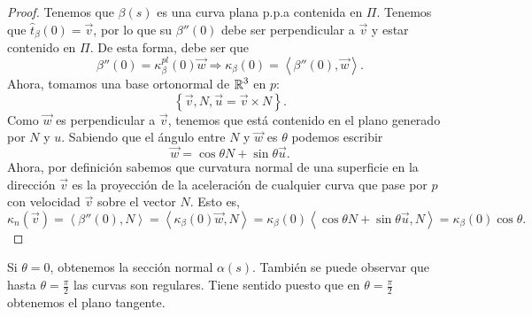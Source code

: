 \begin{proof}
Tenemos que $\displaystyle \beta\left(s\right) $ es una curva plana p.p.a contenida en $\displaystyle \Pi $. Tenemos que $\displaystyle \hat{t}_{\beta }\left(0\right)=\vec{v} $, por lo que su $\displaystyle \beta''\left(0\right) $ debe ser perpendicular a $\displaystyle \vec{v} $ y estar contenido en $\displaystyle \Pi $. De esta forma, debe ser que 
\[\beta''\left(0\right)=\kappa_{\beta }^{pl}\left(0\right)\vec{w} \Rightarrow \kappa_{\beta }\left(0\right)=\left\langle \beta''\left(0\right), \vec{w} \right\rangle  .\]
Ahora, tomamos una base ortonormal de $\displaystyle \mathbb{R}^{3} $ en $\displaystyle p $:
\[ \left\{ \vec{v}, N, \vec{u}= \vec{v} \times N\right\}  .\]
Como $\displaystyle \vec{w} $ es perpendicular a $\displaystyle \vec{v} $, tenemos que está contenido en el plano generado por $\displaystyle N $ y $\displaystyle u $. Sabiendo que el ángulo entre $\displaystyle N $ y $\displaystyle \vec{w} $ es $\displaystyle \theta  $ podemos escribir
\[\vec{w}=\cos\theta N + \sin \theta \vec{u} .\]
Ahora, por definición sabemos que curvatura normal de una superficie en la dirección $\displaystyle \vec{v} $ es la proyección de la aceleración de cualquier curva que pase por $\displaystyle p $ con velocidad $\displaystyle \vec{v} $ sobre el vector $\displaystyle N $. Esto es,
\[\kappa_{n}\left(\vec{v}\right)=\left\langle \beta''\left(0\right), N \right\rangle =\left\langle \kappa_{\beta }\left(0\right)\vec{w}, N \right\rangle =\kappa_{\beta}\left(0\right)\left\langle \cos \theta N + \sin \theta \vec{u}, N \right\rangle =\kappa_{\beta }\left(0\right)\cos \theta .\]
\end{proof}

\begin{observation}
Si $\displaystyle \theta = 0 $, obtenemos la sección normal $\displaystyle \alpha\left(s\right) $. También se puede observar que hasta $\displaystyle \theta = \frac{\pi }{2} $ las curvas son regulares. Tiene sentido puesto que en $\displaystyle \theta = \frac{\pi }{2} $ obtenemos el plano tangente. 
\end{observation}
 
